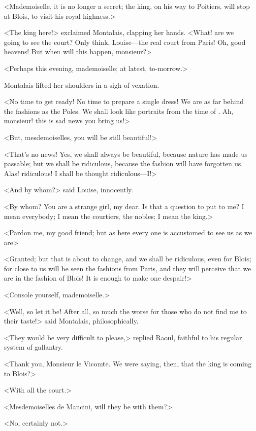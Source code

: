 <Mademoiselle, it is no longer a secret; the king, on his way to Poitiers, will stop at Blois, to visit his royal highness.>

<The king here!> exclaimed Montalais, clapping her hands. <What! are we going to see the court? Only think, Louise—the real court from Paris! Oh, good heavens! But when will this happen, monsieur?>

<Perhaps this evening, mademoiselle; at latest, to-morrow.>

Montalais lifted her shoulders in a sigh of vexation.

<No time to get ready! No time to prepare a single dress! We are as far behind the fashions as the Poles. We shall look like portraits from the time of . Ah, monsieur! this is sad news you bring us!>

<But, mesdemoiselles, you will be still beautiful!>

<That's no news! Yes, we shall always be beautiful, because nature has made us passable; but we shall be ridiculous, because the fashion will have forgotten us. Alas! ridiculous! I shall be thought ridiculous—I!>

<And by whom?> said Louise, innocently.

<By whom? You are a strange girl, my dear. Is that a question to put to me? I mean everybody; I mean the courtiers, the nobles; I mean the king.>

<Pardon me, my good friend; but as here every one is accustomed to see us as we are\longdash>

<Granted; but that is about to change, and we shall be ridiculous, even for Blois; for close to us will be seen the fashions from Paris, and they will perceive that we are in the fashion of Blois! It is enough to make one despair!>

<Console yourself, mademoiselle.>

<Well, so let it be! After all, so much the worse for those who do not find me to their taste!> said Montalais, philosophically.

<They would be very difficult to please,> replied Raoul, faithful to his regular system of gallantry.

<Thank you, Monsieur le Vicomte. We were saying, then, that the king is coming to Blois?>

<With all the court.>

<Mesdemoiselles de Mancini, will they be with them?>

<No, certainly not.>

